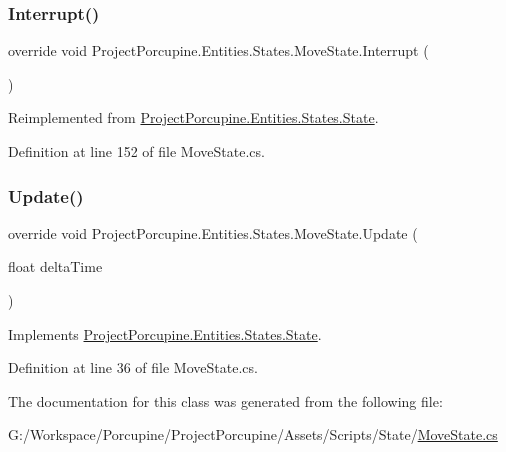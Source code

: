 \subsubsection{\texorpdfstring{Interrupt()}{Interrupt()}}
{\footnotesize\ttfamily override void Project\+Porcupine.\+Entities.\+States.\+Move\+State.\+Interrupt (\begin{DoxyParamCaption}{ }\end{DoxyParamCaption})\hspace{0.3cm}{\ttfamily [virtual]}}



Reimplemented from \hyperlink{class_project_porcupine_1_1_entities_1_1_states_1_1_state_a82fba061891136da0cc359c54337d0be}{Project\+Porcupine.\+Entities.\+States.\+State}.



Definition at line 152 of file Move\+State.\+cs.

\mbox{\label{class_project_porcupine_1_1_entities_1_1_states_1_1_move_state_ab808623899b7a874f6bf6689ebca7def}} 
\subsubsection{\texorpdfstring{Update()}{Update()}}
{\footnotesize\ttfamily override void Project\+Porcupine.\+Entities.\+States.\+Move\+State.\+Update (\begin{DoxyParamCaption}\item[{float}]{delta\+Time }\end{DoxyParamCaption})\hspace{0.3cm}{\ttfamily [virtual]}}



Implements \hyperlink{class_project_porcupine_1_1_entities_1_1_states_1_1_state_a46337df73c448f5dd84e350e987af8b5}{Project\+Porcupine.\+Entities.\+States.\+State}.



Definition at line 36 of file Move\+State.\+cs.



The documentation for this class was generated from the following file\+:\begin{DoxyCompactItemize}
\item 
G\+:/\+Workspace/\+Porcupine/\+Project\+Porcupine/\+Assets/\+Scripts/\+State/\hyperlink{_move_state_8cs}{Move\+State.\+cs}\end{DoxyCompactItemize}
